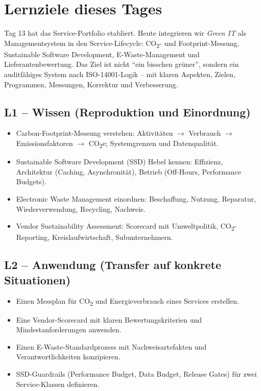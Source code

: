 \documentclass[11pt,a4paper,oneside]{article}
\begin{document}
\section*{Lernziele dieses Tages}
\thispagestyle{plain}

\noindent Tag 13 hat das Service-Portfolio etabliert. Heute integrieren wir \emph{Green IT} als Managementsystem in den Service-Lifecycle: CO\textsubscript{2}- und Footprint-Messung, Sustainable Software Development, E-Waste-Management und Lieferantenbewertung. Das Ziel ist nicht ``ein bisschen grüner'', sondern ein auditfähiges System nach ISO-14001-Logik -- mit klaren Aspekten, Zielen, Programmen, Messungen, Korrektur und Verbesserung.

\subsection*{L1 -- Wissen (Reproduktion und Einordnung)}
\begin{itemize}
  \item Carbon-Footprint-Messung verstehen: Aktivitäten $\to$ Verbrauch $\to$ Emissionsfaktoren $\to$ CO\textsubscript{2}e; Systemgrenzen und Datenqualität.
  \item Sustainable Software Development (SSD) Hebel kennen: Effizienz, Architektur (Caching, Asynchronität), Betrieb (Off-Hours, Performance Budgets).
  \item Electronic Waste Management einordnen: Beschaffung, Nutzung, Reparatur, Wiederverwendung, Recycling, Nachweis.
  \item Vendor Sustainability Assessment: Scorecard mit Umweltpolitik, CO\textsubscript{2}-Reporting, Kreislaufwirtschaft, Subunternehmern.
\end{itemize}

\subsection*{L2 -- Anwendung (Transfer auf konkrete Situationen)}
\begin{itemize}
  \item Einen Messplan für CO\textsubscript{2} und Energieverbrauch eines Services erstellen.
  \item Eine Vendor-Scorecard mit klaren Bewertungskriterien und Mindestanforderungen anwenden.
  \item Einen E-Waste-Standardprozess mit Nachweisartefakten und Verantwortlichkeiten konzipieren.
  \item SSD-Guardrails (Performance Budget, Data Budget, Release Gates) für zwei Service-Klassen definieren.
\end{itemize}
\end{document}
